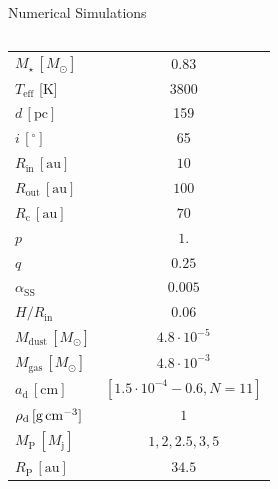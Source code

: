 \documentclass[9pt]{beamer}
\begin{document}
\begin{frame}{Numerical Simulations}
\begin{columns}
\begin{column}{0.6\textwidth}
\begin{columns}
\begin{column}{0.50\textwidth}
\begin{table}
\begin{tabular}{lc}
                            $M_\star\, [M_\odot]$ & $0.83$ \\ 
                            $T_{\text{eff}}$ [K] & 3800 \\ 
                            $d\,[{\text{pc}}]$ & 159 \\
                            $i\,[^{\circ}]$ & 65 \\
                            $R_{\text{in}}\, [\text{au}]$  & $10$ \\
                            $R_{\text{out}}\, [\text{au}]$ & $100$ \\
                            $R_{\text{c}}\, [\text{au}]$ & $70$ \\
                            $p$ & $1.$\\ 
                            $q$ & $0.25$\\
                            $\alpha_{\text{SS}}$  & $ 0.005$    \\
                            $H/R_{\text{in}}$ & $0.06$ \\
                            $M_{\text{dust}}\, [M_\odot]$ & $ 4.8 \cdot 10^{-5}$ \\
                            $M_{\text{gas}}\, [M_\odot]$ &$4.8 \cdot 10^{-3} $ \\
                            $ a_{\mathrm{d}}\, [\text{cm}]$  & $ [1.5\cdot 10^{-4}-0.6,N=11]$ \\
                            $\rho_{\mathrm{d}}\, [\text{g\,cm}^{-3}]$ &$1$ \\
                            \hline
                            $M_{\text{P}}\,[M_{\mathrm{j}}]$   & $1,2,2.5,3,5$\\
                            $R_{\text{P}}\,[\text{au}]$  & $ 34.5 $ \\ 
                            \hline
                        \end{tabular}
                        \end{table}
                \end{column}
            \end{columns}
        \end{column}
    \end{columns}
\end{frame}
\end{document}
